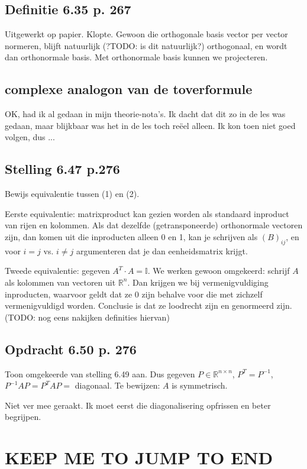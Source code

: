 \documentclass{article}
\begin{document}
\subsection{Definitie 6.35 p. 267}

Uitgewerkt op papier. Klopte. 
Gewoon die orthogonale basis vector per vector normeren, blijft natuurlijk (?TODO: is dit natuurlijk?) orthogonaal, en wordt dan orthonormale basis. 
Met orthonormale basis kunnen we projecteren. 


\subsection{complexe analogon van de toverformule}
OK, had ik al gedaan in mijn theorie-nota's. Ik dacht dat dit zo in de les was gedaan, maar blijkbaar was het in de les toch re\"eel alleen. Ik kon toen niet goed volgen, dus ... 


\subsection{Stelling 6.47 p.276}

Bewijs equivalentie tussen (1) en (2). 

Eerste equivalentie: matrixproduct kan gezien worden als standaard inproduct van rijen en kolommen. Als dat dezelfde (getransponeerde) orthonormale vectoren zijn, 
dan komen uit die inproducten alleen 0 en 1, kan je schrijven als $(B)_{ij}$, en voor $i=j$ vs. $i\neq j$ argumenteren dat je dan eenheidsmatrix krijgt. 

Tweede equivalentie: gegeven $A^T \cdot A = \mathbb{I}$.
We werken gewoon omgekeerd: schrijf $A$ als kolommen van vectoren uit $\mathbb{R}^n$. Dan krijgen we bij vermenigvuldiging inproducten, waarvoor geldt dat ze 0 zijn behalve voor die met zichzelf vermenigvuldigd worden. Conclusie is dat ze loodrecht zijn en genormeerd zijn. 
(TODO: nog eens nakijken definities hiervan) 

\subsection{Opdracht 6.50 p. 276}

Toon omgekeerde van stelling 6.49 aan. 
Dus gegeven $P \in \mathbb{R}^{n \times n}$, $ P^T = P^{-1} $, $P^{-1}AP = P^TAP =$ diagonaal. 
Te bewijzen: $A$ is symmetrisch. 

Niet ver mee geraakt. Ik moet eerst die diagonalisering opfrissen en beter begrijpen. 


\section*{KEEP ME TO JUMP TO END}
\end{document}
